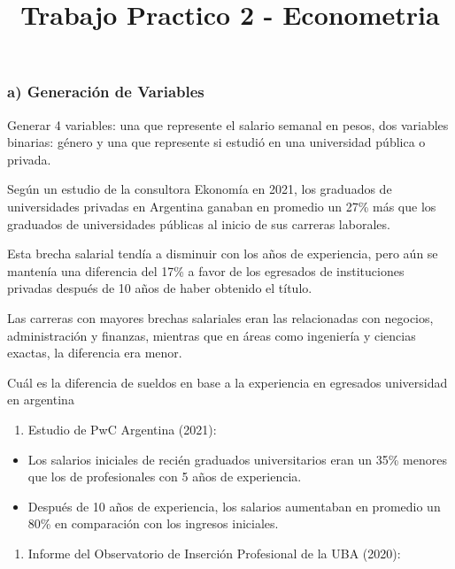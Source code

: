 \documentclass[
]{article}
\title{Trabajo Practico 2 - Econometria}
\author{}
\date{\vspace{-2.5em}}
\providecommand{\tightlist}{%
  \setlength{\itemsep}{0pt}\setlength{\parskip}{0pt}}
\begin{document}
\maketitle

\subsubsection{a) Generación de
Variables}\label{a-generaciuxf3n-de-variables}

Generar 4 variables: una que represente el salario semanal en pesos, dos
variables binarias: género y una que represente si estudió en una
universidad pública o privada.

Según un estudio de la consultora Ekonomía en 2021, los graduados de
universidades privadas en Argentina ganaban en promedio un 27\% más que
los graduados de universidades públicas al inicio de sus carreras
laborales.

Esta brecha salarial tendía a disminuir con los años de experiencia,
pero aún se mantenía una diferencia del 17\% a favor de los egresados de
instituciones privadas después de 10 años de haber obtenido el título.

Las carreras con mayores brechas salariales eran las relacionadas con
negocios, administración y finanzas, mientras que en áreas como
ingeniería y ciencias exactas, la diferencia era menor.

Cuál es la diferencia de sueldos en base a la experiencia en egresados
universidad en argentina

\begin{enumerate}
\def\labelenumi{\arabic{enumi}.}
\tightlist
\item
  Estudio de PwC Argentina (2021):
\end{enumerate}

\begin{itemize}
\tightlist
\item
  Los salarios iniciales de recién graduados universitarios eran un 35\%
  menores que los de profesionales con 5 años de experiencia.
\item
  Después de 10 años de experiencia, los salarios aumentaban en promedio
  un 80\% en comparación con los ingresos iniciales.
\end{itemize}

\begin{enumerate}
\def\labelenumi{\arabic{enumi}.}
\setcounter{enumi}{1}
\tightlist
\item
  Informe del Observatorio de Inserción Profesional de la UBA (2020):
\end{enumerate}
\end{document}
